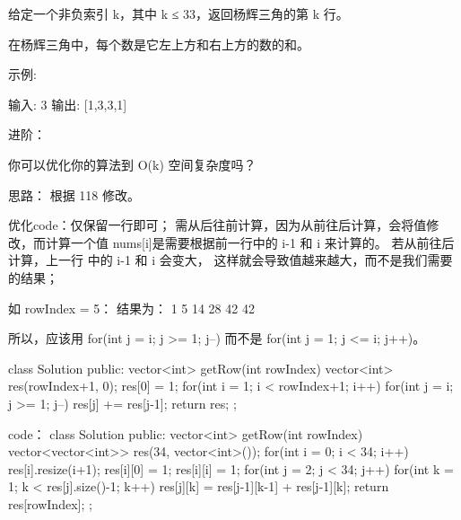 给定一个非负索引 k，其中 k ≤ 33，返回杨辉三角的第 k 行。

在杨辉三角中，每个数是它左上方和右上方的数的和。

示例:

输入: 3
输出: [1,3,3,1]

进阶：

你可以优化你的算法到 O(k) 空间复杂度吗？




































思路：
根据 118 修改。


优化code：仅保留一行即可；
需从后往前计算，因为从前往后计算，会将值修改，而计算一个值 nums[i]是需要根据前一行中的 i-1 和 i 来计算的。
若从前往后计算，上一行 中的 i-1 和 i 会变大， 这样就会导致值越来越大，而不是我们需要的结果；

如 rowIndex = 5：
结果为： 1 5 14 28 42 42

所以，应该用  for(int j = i; j >= 1; j--) 而不是 for(int j = 1; j <= i; j++)。



class Solution {
public:
    vector<int> getRow(int rowIndex) {
        vector<int> res(rowIndex+1, 0);
        res[0] = 1;
        for(int i = 1; i < rowIndex+1; i++)
            for(int j = i; j >= 1; j--)
                res[j] += res[j-1];
        return res;
    }
};


































code：
class Solution {
public:
    vector<int> getRow(int rowIndex) {
        vector<vector<int>> res(34, vector<int>());
        for(int i = 0; i < 34; i++)
        {
            res[i].resize(i+1);
            res[i][0] = 1;
            res[i][i] = 1;
        }
        for(int j = 2; j < 34; j++)
        {
            for(int k = 1; k < res[j].size()-1; k++)
            {
                res[j][k] = res[j-1][k-1] + res[j-1][k];
            }
        }
        return res[rowIndex];
    }
};